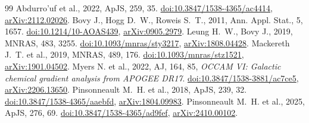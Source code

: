 \documentclass[11pt,a4paper]{article}
\begin{document}
\begin{thebibliography}{99}
 Abdurro'uf et al., 2022, ApJS, 259, 35. \href{https://doi.org/10.3847/1538-4365/ac4414}{doi:10.3847/1538-4365/ac4414}, \href{https://arxiv.org/abs/2112.02026}{arXiv:2112.02026}.
 Bovy J., Hogg D.~W., Roweis S.~T., 2011, Ann. Appl. Stat., 5, 1657. \href{https://doi.org/10.1214/10-AOAS439}{doi:10.1214/10-AOAS439}, \href{https://arxiv.org/abs/0905.2979}{arXiv:0905.2979}.
 Leung H.~W., Bovy J., 2019, MNRAS, 483, 3255. \href{https://doi.org/10.1093/mnras/sty3217}{doi:10.1093/mnras/sty3217}, \href{https://arxiv.org/abs/1808.04428}{arXiv:1808.04428}.
 Mackereth J.~T. et al., 2019, MNRAS, 489, 176. \href{https://doi.org/10.1093/mnras/stz1521}{doi:10.1093/mnras/stz1521}, \href{https://arxiv.org/abs/1901.04502}{arXiv:1901.04502}.
 Myers N. et al., 2022, AJ, 164, 85, \emph{OCCAM VI: Galactic chemical gradient analysis from APOGEE DR17}. \href{https://doi.org/10.3847/1538-3881/ac7ce5}{doi:10.3847/1538-3881/ac7ce5}, \href{https://arxiv.org/abs/2206.13650}{arXiv:2206.13650}.
 Pinsonneault M.~H. et al., 2018, ApJS, 239, 32. \href{https://doi.org/10.3847/1538-4365/aaebfd}{doi:10.3847/1538-4365/aaebfd}, \href{https://arxiv.org/abs/1804.09983}{arXiv:1804.09983}.
 Pinsonneault M.~H. et al., 2025, ApJS, 276, 69. \href{https://doi.org/10.3847/1538-4365/ad9fef}{doi:10.3847/1538-4365/ad9fef}, \href{https://arxiv.org/abs/2410.00102}{arXiv:2410.00102}.
\end{thebibliography}
\end{document}
